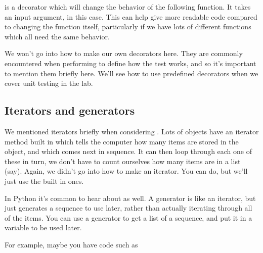 \documentclass[letterpaper,10pt,british]{sphinxmanual}
\begin{document}
\sphinxAtStartPar
{} is a decorator which will change the behavior of the following function. It takes an input argument,  in this case. This can help give more readable code compared to changing the function itself, particularly if we have lots of different functions which all need the same behavior.

\sphinxAtStartPar
We won’t go into how to make our own decorators here. They are commonly encountered when performing {\hyperref[\detokenize{chapters/software_development_tools/automated_testing:unit-testing}]{}} to define how the test works, and so it’s important to mention them briefly here. We’ll see how to use pre\sphinxhyphen{}defined decorators when we cover unit testing in the lab.


\subsection{Iterators and generators}
\label{\detokenize{chapters/programming_fundamentals/advanced_topics:iterators-and-generators}}
\sphinxAtStartPar
We mentioned iterators briefly when considering {\hyperref[\detokenize{chapters/programming_fundamentals/conditionals_and_loops:for-loops}]{}}. Lots of objects have an iterator method built in which tells the computer how many items are stored in the object, and which comes next in sequence. It can then loop through each one of these in turn, we don’t have to count ourselves how many items are in a list (say). Again, we didn’t go into how to make an iterator. You can do, but we’ll just use the built in ones.

\sphinxAtStartPar
In Python it’s common to hear about  as well. A generator is like an iterator, but just generates a sequence to use later, rather than actually iterating through all of the items. You can use a generator to get a list of a sequence, and put it in a variable to be used later.

\sphinxAtStartPar
For example, maybe you have code such as

\begin{sphinxVerbatim}[commandchars=\\\{\}]
         

   
\end{sphinxVerbatim}
\end{document}
